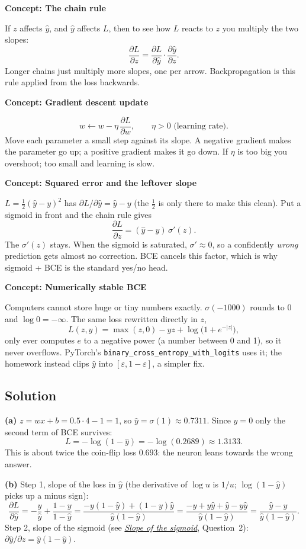 \documentclass[12pt,a4paper]{article}
\newcommand{\concept}[2]{\par\medskip\phantomsection\label{#1}{\large\bfseries\color{blue!50!black} Concept: #2}\par}
\newcommand{\seeconcept}[3]{(see \hyperref[#1]{\textit{#2}}, Question~#3)}
\begin{document}
\concept{c:chain}{The chain rule}
If $z$ affects $\hat y$, and $\hat y$ affects $L$, then to see how $L$ reacts to $z$ you multiply the two slopes:
\[
\frac{\partial L}{\partial z}=\frac{\partial L}{\partial \hat y}\cdot\frac{\partial \hat y}{\partial z}.
\]
Longer chains just multiply more slopes, one per arrow. Backpropagation is this rule applied from the loss backwards.

\concept{c:gd}{Gradient descent update}
\[
w \leftarrow w-\eta\,\frac{\partial L}{\partial w},\qquad \eta>0 \text{ (learning rate).}
\]
Move each parameter a small step against its slope. A negative gradient makes the parameter go up; a positive gradient makes it go down. If $\eta$ is too big you overshoot; too small and learning is slow.

\concept{c:sqerr}{Squared error and the leftover slope}
$L=\tfrac12(\hat y-y)^2$ has $\partial L/\partial\hat y=\hat y-y$ (the $\tfrac12$ is only there to make this clean). Put a sigmoid in front and the chain rule gives
\[
\frac{\partial L}{\partial z}=(\hat y-y)\,\sigma'(z).
\]
The $\sigma'(z)$ stays. When the sigmoid is saturated, $\sigma'\approx0$, so a confidently \emph{wrong} prediction gets almost no correction. BCE cancels this factor, which is why sigmoid + BCE is the standard yes/no head.

\concept{c:stablebce}{Numerically stable BCE}
Computers cannot store huge or tiny numbers exactly. $\sigma(-1000)$ rounds to 0 and $\log 0=-\infty$. The same loss rewritten directly in $z$,
\[
L(z,y)=\max(z,0)-yz+\log\bigl(1+e^{-|z|}\bigr),
\]
only ever computes $e$ to a negative power (a number between 0 and 1), so it never overflows. PyTorch's \texttt{binary\_cross\_entropy\_with\_logits} uses it; the homework instead clips $\hat y$ into $[\varepsilon,1-\varepsilon]$, a simpler fix.

\subsection*{Solution}
\textbf{(a)} $z=wx+b=0.5\cdot4-1=1$, so $\hat y=\sigma(1)\approx0.7311$. Since $y=0$ only the second term of BCE survives:
\[
L=-\log(1-\hat y)=-\log(0.2689)\approx1.3133 .
\]
This is about twice the coin-flip loss $0.693$: the neuron leans towards the wrong answer.

\textbf{(b)} Step 1, slope of the loss in $\hat y$ (the derivative of $\log u$ is $1/u$; $\log(1-\hat y)$ picks up a minus sign):
\[
\frac{\partial L}{\partial\hat y}=-\frac{y}{\hat y}+\frac{1-y}{1-\hat y}
=\frac{-y(1-\hat y)+(1-y)\hat y}{\hat y(1-\hat y)}
=\frac{-y+y\hat y+\hat y-y\hat y}{\hat y(1-\hat y)}=\frac{\hat y-y}{\hat y(1-\hat y)} .
\]
Step 2, slope of the sigmoid \seeconcept{c:sigderiv}{Slope of the sigmoid}{2}: $\partial\hat y/\partial z=\hat y(1-\hat y)$.
\end{document}
